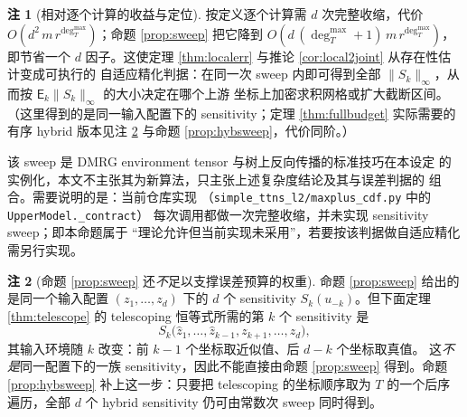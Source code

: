 \documentclass[a4paper,11pt]{article}
\theoremstyle{definition}
\newtheorem{remark}{注}
\newcommand{\1}{\mathbf 1}
\newcommand{\Eerr}{\mathsf E}
\begin{document}
\begin{remark}[相对逐个计算的收益与定位]
\label{rem:sweepgain}
按定义逐个计算需 $d$ 次完整收缩，代价
$O(d^2\,m\,r^{\deg_T^{\max}})$；命题 \ref{prop:sweep} 把它降到
$O(d\,(\deg_T^{\max}+1)\,m\,r^{\deg_T^{\max}})$，即节省一个 $d$ 因子。这使定理
\ref{thm:localerr} 与推论 \ref{cor:local2joint} 从存在性估计变成可执行的
自适应精化判据：在同一次 sweep 内即可得到全部
$\|S_k\|_\infty$，从而按 $\Eerr_k\|S_k\|_\infty$ 的大小决定在哪个上游
坐标上加密求积网格或扩大截断区间。（这里得到的是同一输入配置下的
sensitivity；定理 \ref{thm:fullbudget} 实际需要的有序 hybrid 版本见注
\ref{rem:hybgap} 与命题 \ref{prop:hybsweep}，代价同阶。）

该 sweep 是 DMRG environment tensor 与树上反向传播的标准技巧在本设定
的实例化，本文不主张其为新算法，只主张上述复杂度结论及其与误差判据的
组合。需要说明的是：当前仓库实现
（\texttt{simple\_ttns\_l2/}\allowbreak\texttt{maxplus\_cdf.py} 中的 \texttt{UpperModel.\_contract}）
每次调用都做一次完整收缩，并未实现 sensitivity sweep；即本命题属于
“理论允许但当前实现未采用”，若要按该判据做自适应精化需另行实现。
\end{remark}

\begin{remark}[命题 \ref{prop:sweep} 还\emph{不}足以支撑误差预算的权重]
\label{rem:hybgap}
命题 \ref{prop:sweep} 给出的是同一个输入配置 $(z_1,\ldots,z_d)$ 下的
$d$ 个 sensitivity $S_k(u_{-k})$。但下面定理 \ref{thm:telescope} 的
telescoping 恒等式所需的第 $k$ 个 sensitivity 是
\[
S_k\bigl(\widehat z_1,\ldots,\widehat z_{k-1},z_{k+1},\ldots,z_d\bigr),
\]
其输入环境随 $k$ 改变：前 $k-1$ 个坐标取近似值、后 $d-k$ 个坐标取真值。
这\emph{不是}同一配置下的一族 sensitivity，因此不能直接由命题
\ref{prop:sweep} 得到。命题 \ref{prop:hybsweep} 补上这一步：只要把
telescoping 的坐标顺序取为 $T$ 的一个后序遍历，全部 $d$ 个 hybrid
sensitivity 仍可由常数次 sweep 同时得到。
\end{remark}
\end{document}
